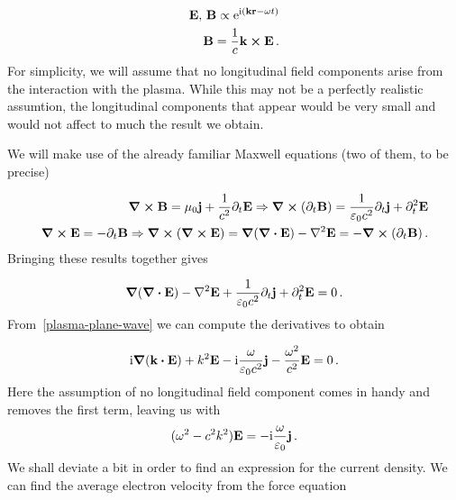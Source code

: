 \documentclass[12pt, class=report, crop=false]{standalone}
\begin{document}
\begin{subequations}
\label{plasma-plane-wave}
  \begin{align}
    \vb{E},\, \vb{B}\propto \ee^{\ii (\vb{k}\vb{r}-\omega t)} \\
    \vb{B} = \frac{1}{c} \vb{k}\cp\vb{E}\,.
  \end{align}
\end{subequations}
For simplicity, we will assume that no longitudinal field components arise from the interaction with the plasma. While this may not be a perfectly realistic assumtion, the longitudinal components that appear would be very small and would not affect to much the result we obtain.

We will make use of the already familiar Maxwell equations (two of them, to be precise)

\begin{subequations}
  \begin{align}
    \curl{\vb{B}} = \mu_0\vb{j} +\frac{1}{c^2} \partial_t \vb{E} \Rightarrow \curl{(\partial_t \vb{B})} = \frac{1}{\varepsilon_0 c^2} \partial_t \vb{j} + \partial_t^2 \vb{E}\\
    \curl{\vb{E}} = - \partial_t \vb{B} \Rightarrow \curl{(\curl{\vb{E}})} = \grad{(\div{\vb{E}})} - \laplacian{\vb{E}} = - \curl{(\partial_t \vb{B})}\,.
  \end{align}
\end{subequations}
Bringing these results together gives

\begin{equation}
  \grad{(\div{\vb{E}})} - \laplacian{\vb{E}} + \frac{1}{\varepsilon_0 c^2} \partial_t \vb{j} + \partial_t^2 \vb{E} = 0\,.
\end{equation}
From~\cref{plasma-plane-wave} we can compute the derivatives to obtain

\begin{equation}
  \ii \grad{(\vb{k}\vdot\vb{E})} + k^2 \vb{E} - \ii \frac{\omega}{\varepsilon_0 c^2} \vb{j} - \frac{\omega^2}{c^2} \vb{E} = 0\,.
\end{equation}
Here the assumption of no longitudinal field component comes in handy and removes the first term, leaving us with
 \begin{equation}
   (\omega^2 - c^2 k^2)\vb{E} = -\mathrm{i} \frac{\omega}{\varepsilon_0} \vb{j}\,.
 \end{equation}
We shall deviate a bit in order to find an expression for the current density. We can find the average electron velocity from the force equation
\end{document}
